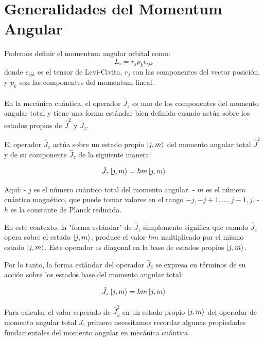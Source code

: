\section{Generalidades del Momentum Angular}
Podemos definir el momentum angular orbital como:
\begin{equation}
	L_i = r_j p_k \epsilon _{ijk}
\end{equation}
donde $\epsilon _{ijk}$ es el tensor de Levi-Civita, $r_j$ son las componentes del vector posición, y $p_k$ son las componentes del momentum lineal. \\

 \\


En la mecánica cuántica, el operador $\hat{J}_z$ es uno de los componentes del momento angular total y tiene una forma estándar bien definida cuando actúa sobre los estados propios de $\hat{J}^2$ y $\hat{J}_z$. 

El operador $\hat{J}_z$ actúa sobre un estado propio $\ket{j, m}$ del momento angular total $\hat{J}^2$ y de su componente $\hat{J}_z$ de la siguiente manera:

\begin{equation}
\hat{J}_z \ket{j, m} = \hbar m \ket{j, m}
\end{equation}

Aquí:
- $j$ es el número cuántico total del momento angular.
- $m$ es el número cuántico magnético, que puede tomar valores en el rango $-j, -j+1, \ldots, j-1, j$.
- $\hbar$ es la constante de Planck reducida.

En este contexto, la "forma estándar" de $\hat{J}_z$ simplemente significa que cuando $\hat{J}_z$ opera sobre el estado $\ket{j, m}$, produce el valor $\hbar m$ multiplicado por el mismo estado $\ket{j, m}$. Este operador es diagonal en la base de estados propios $\ket{j, m}$.

Por lo tanto, la forma estándar del operador $\hat{J}_z$ se expresa en términos de su acción sobre los estados base del momento angular total:

\begin{equation}
\hat{J}_z \ket{j, m} = \hbar m \ket{j, m}
\end{equation}

Para calcular el valor esperado de $\hat{J}_y^2$ en un estado propio $\ket{j, m}$ del operador de momento angular total $\hat{J}$, primero necesitamos recordar algunas propiedades fundamentales del momento angular en mecánica cuántica.

